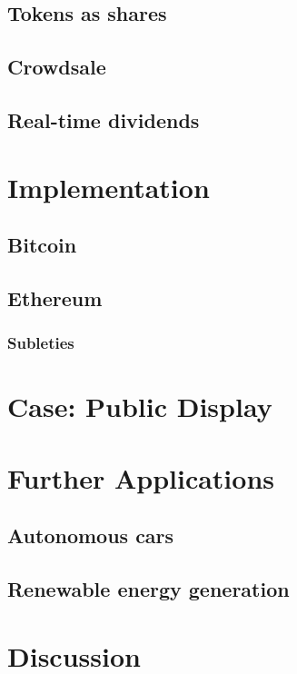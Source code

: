 \subsection{Tokens as shares}

\subsection{Crowdsale}

\subsection{Real-time dividends}


\section{Implementation}

\subsection{Bitcoin}

\subsection{Ethereum}


\subsubsection{Subleties}

\section{Case: Public Display}

\section{Further Applications}

\subsection{Autonomous cars}

\subsection{Renewable energy generation}

\subsection{}

\section{Discussion}
